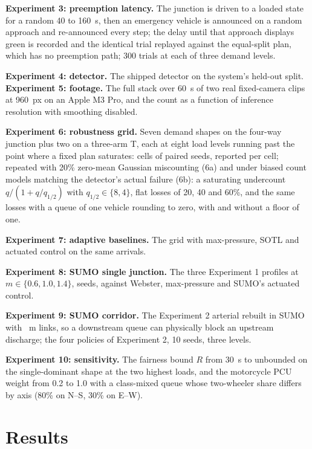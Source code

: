 \documentclass[journal]{IEEEtran}
\newcommand{\pcu}{PCU}
\begin{document}
\textbf{Experiment 3: preemption latency.} The junction is driven to a loaded state for a random 40 to
160~s, then an emergency vehicle is announced on a random approach and re-announced every step; the delay
until that approach displays green is recorded and the identical trial replayed against the equal-split
plan, which has no preemption path; 300 trials at each of three demand levels.

\textbf{Experiment 4: detector.} The shipped detector on the system's held-out split.
\textbf{Experiment 5: footage.} The full stack over 60~s of two real fixed-camera clips at 960~px on an
Apple M3 Pro, and the count as a function of inference resolution with smoothing disabled.

\textbf{Experiment 6: robustness grid.} Seven demand shapes on the four-way junction plus two on a three-arm
T, each at eight load levels running past the point where a fixed plan saturates: \GridCells{} cells of
\GridSeeds{} paired seeds, reported per cell; repeated with 20\% zero-mean Gaussian miscounting (6a) and under
\BiasModels{} biased count models matching the detector's actual failure (6b): a saturating undercount
$q/(1 + q/q_{1/2})$ with $q_{1/2} \in \{8, 4\}$, flat losses of 20, 40 and 60\%, and the same losses with a
queue of one vehicle rounding to zero, with and without a floor of one.

\textbf{Experiment 7: adaptive baselines.} The grid with max-pressure, SOTL and actuated control on the same
arrivals.

\textbf{Experiment 8: SUMO single junction.} The three Experiment 1 profiles at $m \in \{0.6, 1.0, 1.4\}$,
\SumoSeeds{} seeds, against Webster, max-pressure and SUMO's actuated control.

\textbf{Experiment 9: SUMO corridor.} The Experiment 2 arterial rebuilt in SUMO with \ScorrSpacing~m links,
so a downstream queue can physically block an upstream discharge; the four policies of Experiment 2, 10
seeds, three levels.

\textbf{Experiment 10: sensitivity.} The fairness bound $R$ from 30~s to unbounded on the single-dominant shape
at the two highest loads, and the motorcycle \pcu{} weight from 0.2 to 1.0 with a class-mixed queue whose
two-wheeler share differs by axis (80\% on N--S, 30\% on E--W).

\section{Results}
\label{sec:results}
\end{document}
